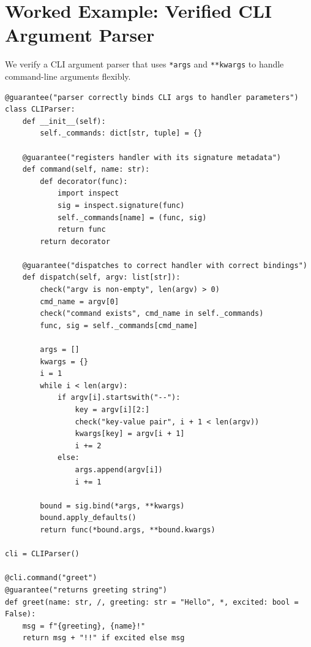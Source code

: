 \documentclass[11pt,a4paper]{report}
\theoremstyle{definition}
\theoremstyle{plain}
\begin{document}
\section{Worked Example: Verified CLI Argument Parser}

We verify a CLI argument parser that uses \texttt{*args} and
\texttt{**kwargs} to handle command-line arguments flexibly.

\begin{lstlisting}[style=synhopy]
@guarantee("parser correctly binds CLI args to handler parameters")
class CLIParser:
    def __init__(self):
        self._commands: dict[str, tuple] = {}

    @guarantee("registers handler with its signature metadata")
    def command(self, name: str):
        def decorator(func):
            import inspect
            sig = inspect.signature(func)
            self._commands[name] = (func, sig)
            return func
        return decorator

    @guarantee("dispatches to correct handler with correct bindings")
    def dispatch(self, argv: list[str]):
        check("argv is non-empty", len(argv) > 0)
        cmd_name = argv[0]
        check("command exists", cmd_name in self._commands)
        func, sig = self._commands[cmd_name]

        args = []
        kwargs = {}
        i = 1
        while i < len(argv):
            if argv[i].startswith("--"):
                key = argv[i][2:]
                check("key-value pair", i + 1 < len(argv))
                kwargs[key] = argv[i + 1]
                i += 2
            else:
                args.append(argv[i])
                i += 1

        bound = sig.bind(*args, **kwargs)
        bound.apply_defaults()
        return func(*bound.args, **bound.kwargs)

cli = CLIParser()

@cli.command("greet")
@guarantee("returns greeting string")
def greet(name: str, /, greeting: str = "Hello", *, excited: bool = False):
    msg = f"{greeting}, {name}!"
    return msg + "!!" if excited else msg
\end{lstlisting}
\end{document}
